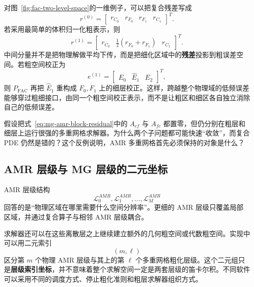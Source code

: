 对图~\ref{fig:fac-two-level-space}的一维例子，可以把复合残差写成
\begin{equation}
r^{(0)}
=
\begin{bmatrix}
r_{C_0}&r_{F_0}&r_{F_1}&r_{C_1}
\end{bmatrix}^T.
\end{equation}
若采用最简单的体积归一化粗表示，则
\begin{equation}
r^{(1)}
=
\begin{bmatrix}
r_{C_0}&\frac12(r_{F_0}+r_{F_1})&r_{C_1}
\end{bmatrix}^T.
\label{eq:fac-one-dimensional-residual-restriction}
\end{equation}
中间分量并不是把物理解做平均下传，而是把细化区域中的\textbf{残差}投影到粗误差空间。若粗空间校正为
\begin{equation}
e^{(1)}
=
\begin{bmatrix}E_0&\widehat E_1&E_2\end{bmatrix}^T,
\end{equation}
则 $P_{\mathrm{FAC}}$ 再把 $\widehat E_1$ 重构成 $F_0,F_1$ 上的细层校正。这样，跨越整个物理域的低频误差能够穿过粗细接口，由同一个粗空间校正表示，而不是让粗区和细区各自独立消除自己的低频误差。

\begin{checkpointbox}
假设把式~\eqref{eq:mg-amr-block-residual}中的 $A_{cf}$ 与 $A_{fc}$ 都置零，但仍分别在粗层和细层上运行很强的多重网格求解器。为什么两个子问题都可能快速“收敛”，而复合 PDE 仍然是错的？这个反例说明，AMR 多重网格首先必须保持的对象是什么？
\end{checkpointbox}

\subsection{AMR 层级与 MG 层级的二元坐标}

AMR 层级结构
\begin{equation}
\mathcal L_0^{AMR},\mathcal L_1^{AMR},\ldots,\mathcal L_M^{AMR}
\end{equation}
回答的是“物理区域在哪里需要什么空间分辨率”。更细的 AMR 层级只覆盖局部区域，并通过复合算子与相邻 AMR 层级耦合。

求解器还可以在这些离散层之上继续建立额外的几何粗空间或代数粗空间。实现中可以用二元索引
\begin{equation}
(m,\ell)
\end{equation}
区分第 $m$ 个物理 AMR 层级与其上的第 $\ell$ 个多重网格粗化层级。这个二元组只是\textbf{层级索引坐标}，并不意味着整个求解空间一定是两套层级的笛卡尔积。不同软件可以采用不同的调度方式、停止粗化准则和粗层求解器组织方式。

